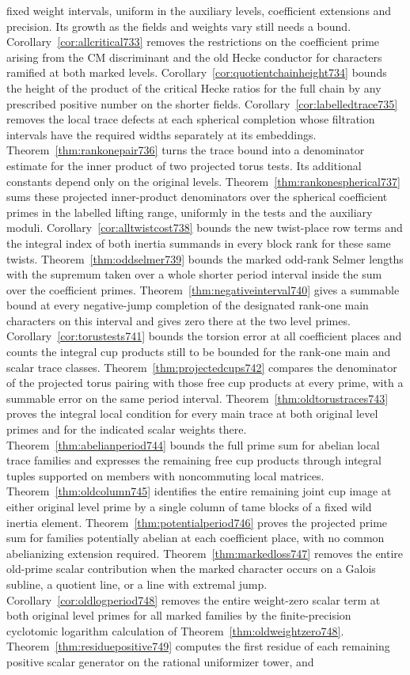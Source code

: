 \documentclass[a4paper,11pt]{article}
\theoremstyle{definition}
\theoremstyle{remark}
\numberwithin{equation}{section}
\begin{document}
fixed weight intervals, uniform in the auxiliary levels, coefficient extensions and precision. Its growth as the fields and weights vary still needs a bound. Corollary~\ref{cor:allcritical733} removes the restrictions on the coefficient prime arising from the CM discriminant and the old Hecke conductor for characters ramified at both marked levels. Corollary~\ref{cor:quotientchainheight734} bounds the height of the product of the critical Hecke ratios for the full chain by any prescribed positive number on the shorter fields. Corollary~\ref{cor:labelledtrace735} removes the local trace defects at each spherical completion whose filtration intervals have the required widths separately at its embeddings. Theorem~\ref{thm:rankonepair736} turns the trace bound into a denominator estimate for the inner product of two projected torus tests. Its additional constants depend only on the original levels. Theorem~\ref{thm:rankonespherical737} sums these projected inner-product denominators over the spherical coefficient primes in the labelled lifting range, uniformly in the tests and the auxiliary moduli. Corollary~\ref{cor:alltwistcost738} bounds the new twist-place row terms and the integral index of both inertia summands in every block rank for these same twists. Theorem~\ref{thm:oddselmer739} bounds the marked odd-rank Selmer lengths with the supremum taken over a whole shorter period interval inside the sum over the coefficient primes. Theorem~\ref{thm:negativeinterval740} gives a summable bound at every negative-jump completion of the designated rank-one main characters on this interval and gives zero there at the two level primes. Corollary~\ref{cor:torustests741} bounds the torsion error at all coefficient places and counts the integral cup products still to be bounded for the rank-one main and scalar trace classes. Theorem~\ref{thm:projectedcups742} compares the denominator of the projected torus pairing with those free cup products at every prime, with a summable error on the same period interval. Theorem~\ref{thm:oldtorustraces743} proves the integral local condition for every main trace at both original level primes and for the indicated scalar weights there. Theorem~\ref{thm:abelianperiod744} bounds the full prime sum for abelian local trace families and expresses the remaining free cup products through integral tuples supported on members with noncommuting local matrices. Theorem~\ref{thm:oldcolumn745} identifies the entire remaining joint cup image at either original level prime by a single column of tame blocks of a fixed wild inertia element. Theorem~\ref{thm:potentialperiod746} proves the projected prime sum for families potentially abelian at each coefficient place, with no common abelianizing extension required. Theorem~\ref{thm:markedloss747} removes the entire old-prime scalar contribution when the marked character occurs on a Galois subline, a quotient line, or a line with extremal jump. Corollary~\ref{cor:oldlogperiod748} removes the entire weight-zero scalar term at both original level primes for all marked families by the finite-precision cyclotomic logarithm calculation of Theorem~\ref{thm:oldweightzero748}. Theorem~\ref{thm:residuepositive749} computes the first residue of each remaining positive scalar generator on the rational uniformizer tower, and 
\end{document}
